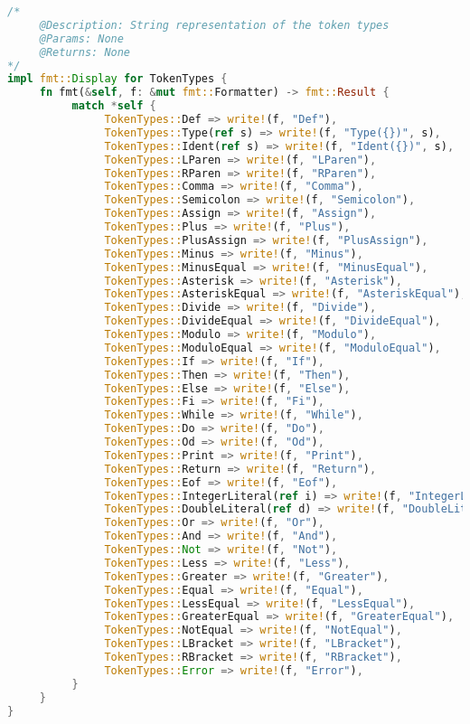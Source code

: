\documentclass[12pt]{article}
\begin{document}
{\begin{lstlisting}[language=Rust]
/*
     @Description: String representation of the token types
     @Params: None
     @Returns: None
*/
impl fmt::Display for TokenTypes {
     fn fmt(&self, f: &mut fmt::Formatter) -> fmt::Result {
          match *self {
               TokenTypes::Def => write!(f, "Def"),
               TokenTypes::Type(ref s) => write!(f, "Type({})", s),
               TokenTypes::Ident(ref s) => write!(f, "Ident({})", s),
               TokenTypes::LParen => write!(f, "LParen"),
               TokenTypes::RParen => write!(f, "RParen"),
               TokenTypes::Comma => write!(f, "Comma"),
               TokenTypes::Semicolon => write!(f, "Semicolon"),
               TokenTypes::Assign => write!(f, "Assign"),
               TokenTypes::Plus => write!(f, "Plus"),
               TokenTypes::PlusAssign => write!(f, "PlusAssign"),
               TokenTypes::Minus => write!(f, "Minus"),
               TokenTypes::MinusEqual => write!(f, "MinusEqual"),
               TokenTypes::Asterisk => write!(f, "Asterisk"),
               TokenTypes::AsteriskEqual => write!(f, "AsteriskEqual"),
               TokenTypes::Divide => write!(f, "Divide"),
               TokenTypes::DivideEqual => write!(f, "DivideEqual"),
               TokenTypes::Modulo => write!(f, "Modulo"),
               TokenTypes::ModuloEqual => write!(f, "ModuloEqual"),
               TokenTypes::If => write!(f, "If"),
               TokenTypes::Then => write!(f, "Then"),
               TokenTypes::Else => write!(f, "Else"),
               TokenTypes::Fi => write!(f, "Fi"),
               TokenTypes::While => write!(f, "While"),
               TokenTypes::Do => write!(f, "Do"),
               TokenTypes::Od => write!(f, "Od"),
               TokenTypes::Print => write!(f, "Print"),
               TokenTypes::Return => write!(f, "Return"),
               TokenTypes::Eof => write!(f, "Eof"),
               TokenTypes::IntegerLiteral(ref i) => write!(f, "IntegerLiteral({})", i),
               TokenTypes::DoubleLiteral(ref d) => write!(f, "DoubleLiteral({})", d),
               TokenTypes::Or => write!(f, "Or"),
               TokenTypes::And => write!(f, "And"),
               TokenTypes::Not => write!(f, "Not"),
               TokenTypes::Less => write!(f, "Less"),
               TokenTypes::Greater => write!(f, "Greater"),
               TokenTypes::Equal => write!(f, "Equal"),
               TokenTypes::LessEqual => write!(f, "LessEqual"),
               TokenTypes::GreaterEqual => write!(f, "GreaterEqual"),
               TokenTypes::NotEqual => write!(f, "NotEqual"),
               TokenTypes::LBracket => write!(f, "LBracket"),
               TokenTypes::RBracket => write!(f, "RBracket"),
               TokenTypes::Error => write!(f, "Error"),
          }
     }
}


\end{lstlisting}}
\end{document}
